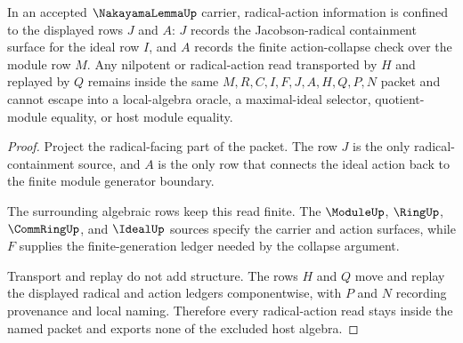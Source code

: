\begin{theorem}
\label{thm:nakayama-lemma-nilpotent-radical-nonescape}
In an accepted $\NakayamaLemmaUp$ carrier, radical-action information is
confined to the displayed rows $J$ and $A$: $J$ records the
Jacobson-radical containment surface for the ideal row $I$, and $A$ records
the finite action-collapse check over the module row $M$. Any nilpotent or
radical-action read transported by $H$ and replayed by $Q$ remains inside the
same $M,R,C,I,F,J,A,H,Q,P,N$ packet and cannot escape into a local-algebra
oracle, a maximal-ideal selector, quotient-module equality, or host module
equality.
\end{theorem}
\begin{proof}
Project the radical-facing part of the packet. The row $J$ is the only
radical-containment source, and $A$ is the only row that connects the ideal
action back to the finite module generator boundary.

The surrounding algebraic rows keep this read finite. The $\ModuleUp$,
$\RingUp$, $\CommRingUp$, and $\IdealUp$ sources specify the carrier and
action surfaces, while $F$ supplies the finite-generation ledger needed by the
collapse argument.

Transport and replay do not add structure. The rows $H$ and $Q$ move and
replay the displayed radical and action ledgers componentwise, with $P$ and
$N$ recording provenance and local naming. Therefore every radical-action read
stays inside the named packet and exports none of the excluded host algebra.
\end{proof}


\begin{closurestatus}{\NakayamaLemmaUp}
  \theoryclosure{\seedClosure}
  \formalstatus{\unformalizedV}
\end{closurestatus}
